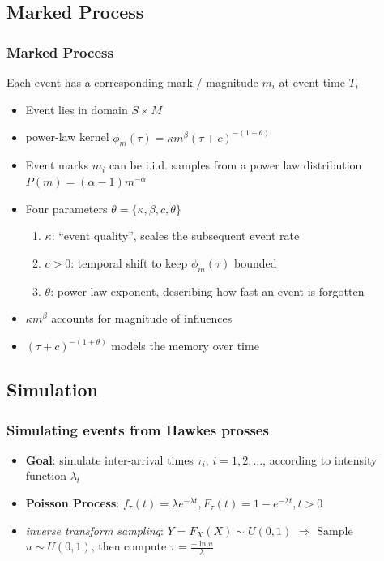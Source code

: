 \documentclass{beamer}
\begin{document}
\subsection{Marked Process}
\begin{frame}
	\frametitle{Marked Process}
	Each event has a corresponding mark / magnitude $m_i$ at event time $T_i$
	\begin{itemize}
		\item Event lies in domain $S \times M$
		\item power-law kernel $\phi_m(\tau) = \kappa m^{\beta}(\tau + c)^{-(1+\theta)}$
		\item Event marks $m_i$ can be i.i.d. samples from a power law distribution $P(m)=(\alpha - 1) m^{-\alpha }$
		\item Four parameters $\theta = \{\kappa,\beta,c,\theta\}$
		\begin{enumerate}
			\item $\kappa$: ``event quality'', scales the subsequent event rate
			\item $c>0$: temporal shift to keep $\phi_m(\tau)$ bounded
			\item $\theta$: power-law exponent, describing how fast an event is forgotten
		\end{enumerate}
		\item $\kappa m^{\beta}$ accounts for magnitude of influences
		\item $(\tau + c)^{-(1+\theta)}$ models the memory over time
	\end{itemize}
\end{frame}

\subsection{Simulation}

\begin{frame}
	\frametitle{Simulating events from Hawkes prosses}
	\begin{itemize}
		\item \textbf{Goal}: simulate inter-arrival times $\tau_i$, $i=1,2,\dots$, according to intensity function $\lambda_t$
		\item \textbf{Poisson Process}: $f_{\tau}(t)=\lambda e^{-\lambda t},F_{\tau}(t)=1-e^{-\lambda t} , t>0$
		\item \textit{inverse transform sampling}: $Y=F_X(X) \sim U(0,1)$ $\Rightarrow$ Sample $u\sim U(0,1)$, then compute $\tau=\frac{- \ln u}{\lambda}$
	\end{itemize}
\end{frame}
\end{document}
